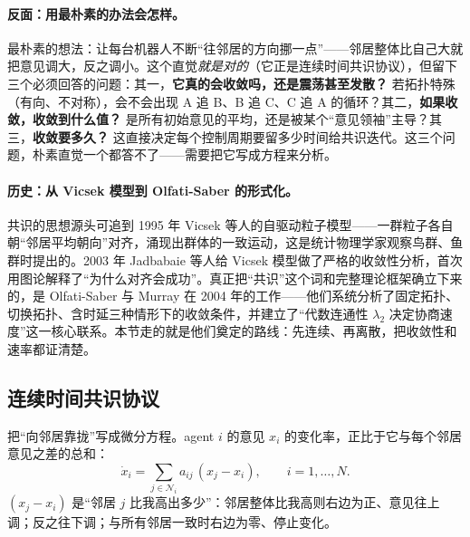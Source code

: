 \paragraph{反面：用最朴素的办法会怎样。}
最朴素的想法：让每台机器人不断“往邻居的方向挪一点”——邻居整体比自己大就把意见调大，反之调小。这个直觉\emph{就是对的}（它正是连续时间共识协议），但留下三个必须回答的问题：其一，\textbf{它真的会收敛吗，还是震荡甚至发散？} 若拓扑特殊（有向、不对称），会不会出现 A 追 B、B 追 C、C 追 A 的循环？其二，\textbf{如果收敛，收敛到什么值？} 是所有初始意见的平均，还是被某个“意见领袖”主导？其三，\textbf{收敛要多久？} 这直接决定每个控制周期要留多少时间给共识迭代。这三个问题，朴素直觉一个都答不了——需要把它写成方程来分析。

\paragraph{历史：从 Vicsek 模型到 Olfati-Saber 的形式化。}
共识的思想源头可追到 1995 年 Vicsek 等人的自驱动粒子模型——一群粒子各自朝“邻居平均朝向”对齐，涌现出群体的一致运动，这是统计物理学家观察鸟群、鱼群时提出的\cite{vicsek1995novel}。2003 年 Jadbabaie 等人给 Vicsek 模型做了严格的收敛性分析，首次用图论解释了“为什么对齐会成功”\cite{jadbabaie2003coordination}。真正把“共识”这个词和完整理论框架确立下来的，是 Olfati-Saber 与 Murray 在 2004 年的工作——他们系统分析了固定拓扑、切换拓扑、含时延三种情形下的收敛条件，并建立了“代数连通性 $\lambda_2$ 决定协商速度”这一核心联系\cite{olfatisaber2004consensus}。本节走的就是他们奠定的路线：先连续、再离散，把收敛性和速率都证清楚。

\subsection{连续时间共识协议}
\label{sec:cs-cont}

把“向邻居靠拢”写成微分方程。agent $i$ 的意见 $x_i$ 的变化率，正比于它与每个邻居意见之差的总和：
\begin{equation}
  \dot x_i = \sum_{j\in\mathcal{N}_i} a_{ij}\,(x_j - x_i),\qquad i=1,\dots,N.
  \label{eq:cs-cont-scalar}
\end{equation}
$(x_j-x_i)$ 是“邻居 $j$ 比我高出多少”：邻居整体比我高则右边为正、意见往上调；反之往下调；与所有邻居一致时右边为零、停止变化。

